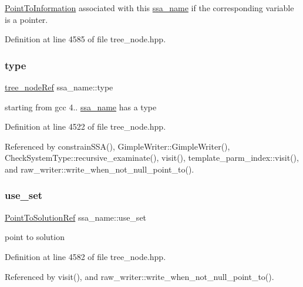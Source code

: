 \hyperlink{structPointToInformation}{Point\+To\+Information} associated with this \hyperlink{structssa__name}{ssa\+\_\+name} if the corresponding variable is a pointer. 



Definition at line 4585 of file tree\+\_\+node.\+hpp.

\mbox{\label{structssa__name_adcc5d4b577bfdad6e2bfc7d869b78e5a}} 
\subsubsection{\texorpdfstring{type}{type}}
{\footnotesize\ttfamily \hyperlink{tree__node_8hpp_a6ee377554d1c4871ad66a337eaa67fd5}{tree\+\_\+node\+Ref} ssa\+\_\+name\+::type}



starting from gcc 4.. \hyperlink{structssa__name}{ssa\+\_\+name} has a type 



Definition at line 4522 of file tree\+\_\+node.\+hpp.



Referenced by constrain\+S\+S\+A(), Gimple\+Writer\+::\+Gimple\+Writer(), Check\+System\+Type\+::recursive\+\_\+examinate(), visit(), template\+\_\+parm\+\_\+index\+::visit(), and raw\+\_\+writer\+::write\+\_\+when\+\_\+not\+\_\+null\+\_\+point\+\_\+to().

\mbox{\label{structssa__name_a479624c741ee4a0d9ba108694e67e000}} 
\subsubsection{\texorpdfstring{use\+\_\+set}{use\_set}}
{\footnotesize\ttfamily \hyperlink{tree__node_8hpp_a4b5be0c528f25b8cb0b0fbc3b957d725}{Point\+To\+Solution\+Ref} ssa\+\_\+name\+::use\+\_\+set}



point to solution 



Definition at line 4582 of file tree\+\_\+node.\+hpp.



Referenced by visit(), and raw\+\_\+writer\+::write\+\_\+when\+\_\+not\+\_\+null\+\_\+point\+\_\+to().

